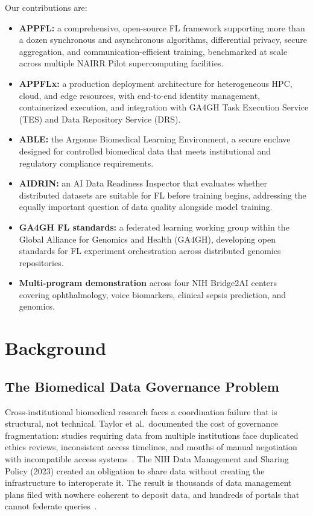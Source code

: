 \documentclass[conference]{IEEEtran}
\begin{document}
Our contributions are:
\begin{itemize}
    \item \textbf{APPFL:} a comprehensive, open-source FL framework supporting more than a dozen synchronous and asynchronous algorithms, differential privacy, secure aggregation, and communication-efficient training, benchmarked at scale across multiple NAIRR Pilot supercomputing facilities.
    \item \textbf{APPFLx:} a production deployment architecture for heterogeneous HPC, cloud, and edge resources, with end-to-end identity management, containerized execution, and integration with GA4GH Task Execution Service (TES) and Data Repository Service (DRS).
    \item \textbf{ABLE:} the Argonne Biomedical Learning Environment, a secure enclave designed for controlled biomedical data that meets institutional and regulatory compliance requirements.
    \item \textbf{AIDRIN:} an AI Data Readiness Inspector that evaluates whether distributed datasets are suitable for FL before training begins, addressing the equally important question of data quality alongside model training.
    \item \textbf{GA4GH FL standards:} a federated learning working group within the Global Alliance for Genomics and Health (GA4GH), developing open standards for FL experiment orchestration across distributed genomics repositories.
    \item \textbf{Multi-program demonstration} across four NIH Bridge2AI centers covering ophthalmology, voice biomarkers, clinical sepsis prediction, and genomics.
\end{itemize}

\section{Background}

\subsection{The Biomedical Data Governance Problem}

Cross-institutional biomedical research faces a coordination failure that is structural, not technical. Taylor et al.\ documented the cost of governance fragmentation: studies requiring data from multiple institutions face duplicated ethics reviews, inconsistent access timelines, and months of manual negotiation with incompatible access systems~\cite{taylor2021}. The NIH Data Management and Sharing Policy (2023) created an obligation to share data without creating the infrastructure to interoperate it. The result is thousands of data management plans filed with nowhere coherent to deposit data, and hundreds of portals that cannot federate queries~\cite{varma2026current}.
\end{document}
